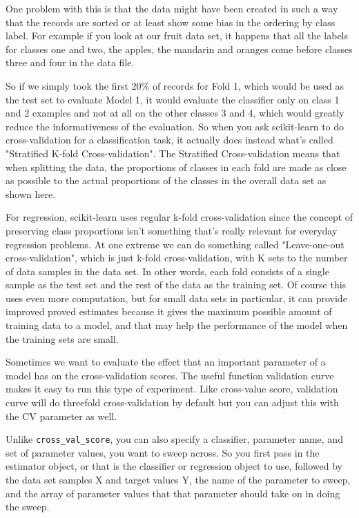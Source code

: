 \begin{multicols}{2}
One problem with this is that the data might have been created in such a way that the records are sorted or at least show some bias in the ordering by class label. For example if you look at our fruit data set, it happens that all the labels for classes one and two, the apples, the mandarin and oranges come before classes three and four in the data file. 

So if we simply took the first 20\% of records for Fold 1, which would be used as the test set to evaluate Model 1, it would evaluate the classifier only on class 1 and 2 examples and not at all on the other classes 3 and 4, which would greatly reduce the informativeness of the evaluation. So when you ask scikit-learn to do cross-validation for a classification task, it actually does instead what's called "Stratified K-fold Cross-validation". The Stratified Cross-validation means that when splitting the data, the proportions of classes in each fold are made as close as possible to the actual proportions of the classes in the overall data set as shown here. 

For regression, scikit-learn uses regular k-fold cross-validation since the concept of preserving class proportions isn't something that's really relevant for everyday regression problems. At one extreme we can do something called "Leave-one-out cross-validation", which is just k-fold cross-validation, with K sets to the number of data samples in the data set. In other words, each fold consists of a single sample as the test set and the rest of the data as the training set. Of course this uses even more computation, but for small data sets in particular, it can provide improved proved estimates because it gives the maximum possible amount of training data to a model, and that may help the performance of the model when the training sets are small. 

Sometimes we want to evaluate the effect that an important parameter of a model has on the cross-validation scores. The useful function validation curve makes it easy to run this type of experiment. Like cross-value score, validation curve will do threefold cross-validation by default but you can adjust this with the CV parameter as well. 

Unlike \texttt{cross_val_score}, you can also specify a classifier, parameter name, and set of parameter values, you want to sweep across. So you first pass in the estimator object, or that is the classifier or regression object to use, followed by the data set samples X and target values Y, the name of the parameter to sweep, and the array of parameter values that that parameter should take on in doing the sweep. 


\end{multicols}
